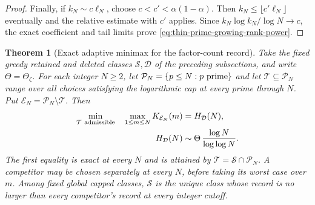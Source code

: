 \documentclass[11pt]{article}
\newtheorem{theorem}{Theorem}[section]
\theoremstyle{definition}
\begin{document}
\begin{proof}
Finally, if $k_N\sim c\ell_N$, choose
$c<c'<\alpha(1-\alpha)$.
Then $k_N\le\lfloor c'\ell_N\rfloor$ eventually and the
relative estimate with $c'$ applies.
Since $k_N\log k_N/\log N\to c$, the exact coefficient and
tail limits prove
\eqref{eq:thin-prime-growing-rank-power}.
\end{proof}

\begin{theorem}[Exact adaptive minimax for the factor-count record]
\label{thm:greedy-adaptive-support-minimax}
Take the fixed greedy retained and deleted classes
$\mathcal S,\mathcal D$ of the preceding subsections, and
write $\Theta=\Theta_\zeta$.
For each integer $N\ge2$, let
$\mathcal P_N=\{p\le N:p\ {\rm prime}\}$ and let
$\mathcal T\subseteq\mathcal P_N$ range over all choices
satisfying the logarithmic cap at every prime through $N$.
Put $\mathcal E_N=\mathcal P_N\setminus\mathcal T$.
Then
\begin{equation}
 \begin{aligned}
 \min_{\mathcal T\ {\rm admissible}}\quad
       \max_{1\le m\le N}K_{\mathcal E_N}(m)
      &=H_{\mathcal D}(N),\\
 H_{\mathcal D}(N)
      &\sim\Theta\,\frac{\log N}{\log\log N}.
 \end{aligned}
 \label{eq:greedy-adaptive-support-minimax}
\end{equation}
The first equality is exact at every $N$ and is attained by
$\mathcal T=\mathcal S\cap\mathcal P_N$.
A competitor may be chosen separately at every $N$, before
taking its worst case over $m$.
Among fixed global capped classes, $\mathcal S$ is the
unique class whose record is no larger than every
competitor's record at every integer cutoff.
\end{theorem}
\end{document}
